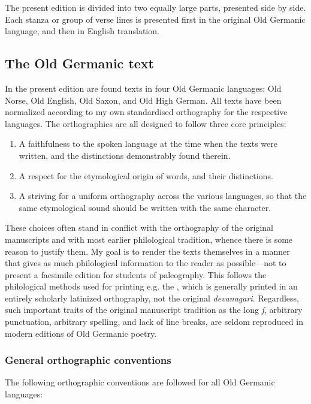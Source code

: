   The present edition is divided into two equally large parts, presented side by side. Each stanza or group of verse lines is presented first in the original Old Germanic language, and then in English translation.

  \subsection{The Old Germanic text}

    In the present edition are found texts in four Old Germanic languages: Old Norse, Old English, Old Saxon, and Old High German.  All texts have been normalized according to my own standardised orthography for the respective languages. The orthographies are all designed to follow three core principles:

    \begin{enumerate}
      \item A faithfulness to the spoken language at the time when the texts were written, and the distinctions demonstrably found therein.
      \item A respect for the etymological origin of words, and their distinctions.
      \item A striving for a uniform orthography across the various languages, so that the same etymological sound should be written with the same character.
    \end{enumerate}

    These choices often stand in conflict with the orthography of the original manuscripts and with most earlier philological tradition, whence there is some reason to justify them.  My goal is to render the texts themselves in a manner that gives as much philological information to the reader as possible—not to present a facsimile edition for students of paleography.  This follows the philological methods used for printing e.g. the \Rigveda, which is generally printed in an entirely scholarly latinized orthography, not the original \emph{devanagari}.  Regardless, such important traits of the original manuscript tradition as the long \emph{ſ}, arbitrary punctuation, arbitrary spelling, and lack of line breaks, are seldom reproduced in modern editions of Old Germanic poetry.

    \subsubsection{General orthographic conventions}

    The following orthographic conventions are followed for all Old Germanic languages:

